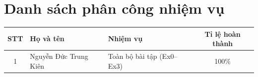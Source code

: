 \newpage
\thispagestyle{empty}

\section*{Danh sách phân công nhiệm vụ}

\begin{table}[h]
\centering
\begin{tabular}{|c|l|l|c|}
\hline
\textbf{STT} & \textbf{Họ và tên} & \textbf{Nhiệm vụ} & \textbf{Tỉ lệ hoàn thành} \\
\hline
1 & Nguyễn Đức Trung Kiên & Toàn bộ bài tập (Ex0--Ex3) & 100\% \\
\hline
\end{tabular}
\end{table}

\newpage
\tableofcontents
\newpage
